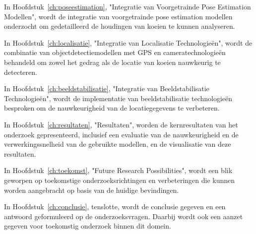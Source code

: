 In Hoofdstuk~\ref{ch:poseestimation}, "Integratie van Voorgetrainde Pose Estimation Modellen", wordt de integratie van voorgetrainde pose estimation modellen onderzocht om gedetailleerd de houdingen van koeien te kunnen analyseren.

In Hoofdstuk~\ref{ch:localisatie}, "Integratie van Localisatie Technologieën", wordt de combinatie van objectdetectiemodellen met GPS en cameratechnologieën behandeld om zowel het gedrag als de locatie van koeien nauwkeurig te detecteren.

In Hoofdstuk~\ref{ch:beeldstabilisatie}, "Integratie van Beeldstabilisatie Technologieën", wordt de implementatie van beeldstabilisatie technologieën besproken om de nauwkeurigheid van de locatiegegevens te verbeteren.

In Hoofdstuk~\ref{ch:resultaten}, "Resultaten", worden de kernresultaten van het onderzoek gepresenteerd, inclusief een evaluatie van de nauwkeurigheid en de verwerkingssnelheid van de gebruikte modellen, en de visualisatie van deze resultaten.

In Hoofdstuk~\ref{ch:toekomst}, "Future Research Possibilities", wordt een blik geworpen op toekomstige onderzoeksrichtingen en verbeteringen die kunnen worden aangebracht op basis van de huidige bevindingen.

In Hoofdstuk~\ref{ch:conclusie}, tenslotte, wordt de conclusie gegeven en een antwoord geformuleerd op de onderzoeksvragen. Daarbij wordt ook een aanzet gegeven voor toekomstig onderzoek binnen dit domein.